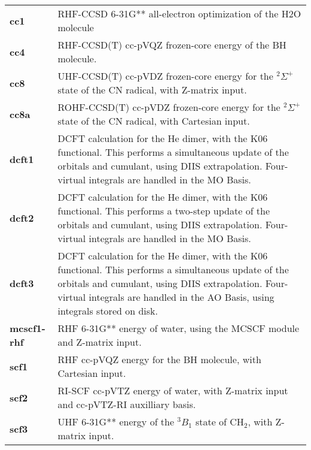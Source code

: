\begin{tabular*}{\textwidth}[tb]{p{}p{}}
{\bf cc1} &  RHF-CCSD 6-31G** all-electron optimization of the H2O molecule\\
{\bf cc4} &  RHF-CCSD(T) cc-pVQZ frozen-core energy of the BH molecule.\\
{\bf cc8} &  UHF-CCSD(T) cc-pVDZ frozen-core energy for the $^2\Sigma^+$ state of the CN radical, with Z-matrix input.\\
{\bf cc8a} &  ROHF-CCSD(T) cc-pVDZ frozen-core energy for the $^2\Sigma^+$ state of the CN radical, with Cartesian input.\\
{\bf dcft1} &  DCFT calculation for the He dimer, with the K06 functional. This performs a simultaneous update of the orbitals and cumulant, using DIIS extrapolation. Four-virtual integrals are handled in the MO Basis.\\
{\bf dcft2} &  DCFT calculation for the He dimer, with the K06 functional. This performs a two-step update of the orbitals and cumulant, using DIIS extrapolation. Four-virtual integrals are handled in the MO Basis.\\
{\bf dcft3} &  DCFT calculation for the He dimer, with the K06 functional. This performs a simultaneous update of the orbitals and cumulant, using DIIS extrapolation. Four-virtual integrals are handled in the AO Basis, using integrals stored on disk.\\
{\bf mcscf1-rhf} &  RHF 6-31G** energy of water, using the MCSCF module and Z-matrix input.\\
{\bf scf1} &  RHF cc-pVQZ energy for the BH molecule, with Cartesian input.\\
{\bf scf2} &  RI-SCF cc-pVTZ energy of water, with Z-matrix input and cc-pVTZ-RI auxilliary basis.\\
{\bf scf3} &  UHF 6-31G** energy of the $^3B_1$ state of CH$_2$, with Z-matrix input.\\
\end{tabular*}